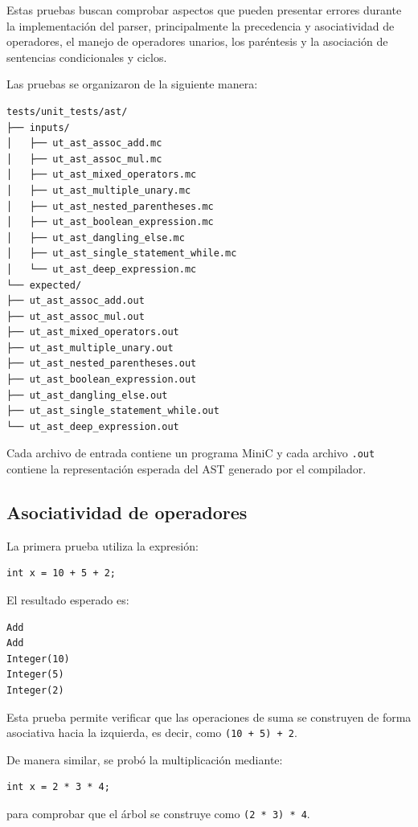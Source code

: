 \documentclass[12pt,letterpaper]{article}
\begin{document}
Estas pruebas buscan comprobar aspectos que pueden presentar errores durante la implementación del parser, principalmente la precedencia y asociatividad de operadores, el manejo de operadores unarios, los paréntesis y la asociación de sentencias condicionales y ciclos.

Las pruebas se organizaron de la siguiente manera:

\begin{verbatim}
tests/unit_tests/ast/
├── inputs/
│   ├── ut_ast_assoc_add.mc
│   ├── ut_ast_assoc_mul.mc
│   ├── ut_ast_mixed_operators.mc
│   ├── ut_ast_multiple_unary.mc
│   ├── ut_ast_nested_parentheses.mc
│   ├── ut_ast_boolean_expression.mc
│   ├── ut_ast_dangling_else.mc
│   ├── ut_ast_single_statement_while.mc
│   └── ut_ast_deep_expression.mc
└── expected/
├── ut_ast_assoc_add.out
├── ut_ast_assoc_mul.out
├── ut_ast_mixed_operators.out
├── ut_ast_multiple_unary.out
├── ut_ast_nested_parentheses.out
├── ut_ast_boolean_expression.out
├── ut_ast_dangling_else.out
├── ut_ast_single_statement_while.out
└── ut_ast_deep_expression.out
\end{verbatim}

Cada archivo de entrada contiene un programa MiniC y cada archivo \texttt{.out} contiene la representación esperada del AST generado por el compilador.

\subsection*{Asociatividad de operadores}

La primera prueba utiliza la expresión:

\begin{verbatim}
int x = 10 + 5 + 2;
\end{verbatim}

El resultado esperado es:

\begin{verbatim}
Add
Add
Integer(10)
Integer(5)
Integer(2)
\end{verbatim}

Esta prueba permite verificar que las operaciones de suma se construyen de forma asociativa hacia la izquierda, es decir, como \texttt{(10 + 5) + 2}.

De manera similar, se probó la multiplicación mediante:

\begin{verbatim}
int x = 2 * 3 * 4;
\end{verbatim}

para comprobar que el árbol se construye como \texttt{(2 * 3) * 4}.
\end{document}
